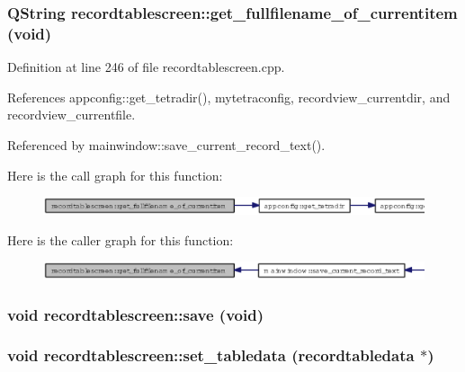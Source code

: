 \subsubsection{\setlength{\rightskip}{0pt plus 5cm}QString recordtablescreen::get\_\-fullfilename\_\-of\_\-currentitem (void)}\label{classrecordtablescreen_a3fac56820514280445d9ef0de9f1632}




Definition at line 246 of file recordtablescreen.cpp.

References appconfig::get\_\-tetradir(), mytetraconfig, recordview\_\-currentdir, and recordview\_\-currentfile.

Referenced by mainwindow::save\_\-current\_\-record\_\-text().

Here is the call graph for this function:\begin{figure}[H]
\begin{center}
\leavevmode
\includegraphics[width=396pt]{classrecordtablescreen_a3fac56820514280445d9ef0de9f1632_cgraph}
\end{center}
\end{figure}


Here is the caller graph for this function:\begin{figure}[H]
\begin{center}
\leavevmode
\includegraphics[width=383pt]{classrecordtablescreen_a3fac56820514280445d9ef0de9f1632_icgraph}
\end{center}
\end{figure}
\subsubsection{\setlength{\rightskip}{0pt plus 5cm}void recordtablescreen::save (void)}\label{classrecordtablescreen_8586c6a01418e5ef3f3561f421f4beea}


\subsubsection{\setlength{\rightskip}{0pt plus 5cm}void recordtablescreen::set\_\-tabledata ({\bf recordtabledata} $\ast$)}\label{classrecordtablescreen_e1572a908c5e8c72af3ed0000375e2dd}




